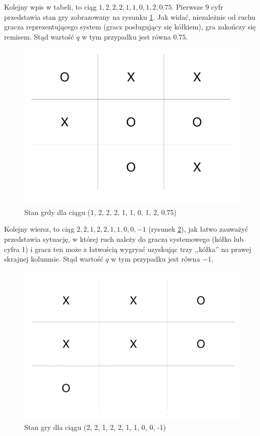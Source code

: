 \documentclass[licencjacka]{pracamgr}
\begin{document}
Kolejny wpis w tabeli, to ciąg $1, 2, 2, 2, 1, 1, 0, 1, 2, 0.75$. Pierwsze 9 cyfr przedstawia stan gry zobrazowany na rysunku \ref{Rys10}. Jak widać, niezależnie od ruchu gracza reprezentującego system (gracz posługujący się kółkiem), gra zakończy się remisem. Stąd wartość $q$ w tym przypadku jest równa $0.75$. 

\begin{figure}[h!]
	\includegraphics [scale=0.22] {ttt_2.png}
	\caption{Stan grdy dla ciągu (1, 2, 2, 2, 1, 1, 0, 1, 2, 0.75)}
	\label{Rys10}
\end{figure}

Kolejny wiersz, to ciąg $2, 2, 1, 2,  2, 1, 1, 0, 0, -1$ (rysunek \ref{Rys11}), jak łatwo zauważyć przedstawia sytuację, w której  ruch należy do gracza systemowego (kółko lub cyfra 1) i gracz ten może z łatwością wygryać uzyskując trzy ,,kółka'' na prawej skrajnej kolumnie. Stąd wartość $q$ w tym przypadku jest równa $-1$.

\begin{figure}[H]
	\includegraphics [scale=0.22] {ttt_3.png}
	\caption{Stan gry dla ciągu (2, 2, 1, 2,  2, 1, 1, 0, 0, -1)}
	\label{Rys11}
\end{figure}
\end{document}
